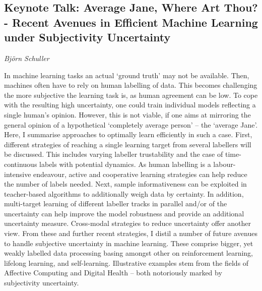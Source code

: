 \documentclass[../booklet.tex]{subfiles}
\begin{document}
\subsection[Keynote Talk: Average Jane, Where Art Thou? - Recent Avenues in Efficient Machine Learning under Subjectivity Uncertainty. {\it Björn Schuller}]{Keynote Talk: Average Jane, Where Art Thou? - Recent Avenues in Efficient Machine Learning under Subjectivity Uncertainty}

\begin{center}
  {\it Björn Schuller}
\end{center}

\vskip 0.8cm


In machine learning tasks an actual `ground truth' may not be available. Then, machines often have to rely on human labelling of data. This becomes challenging the more subjective the learning task is, as human agreement can be low. To cope with the resulting high uncertainty, one could train individual models reflecting a single human's opinion. However, this is not viable, if one aims at mirroring the general opinion of a hypothetical `completely average person' -- the `average Jane'. Here, I summarise approaches to optimally learn efficiently in such a case. First, different strategies of reaching a single learning target from several labellers will be discussed. This includes varying labeller trustability and the case of time-continuous labels with potential dynamics. As human labelling is a labour-intensive endeavour, active and cooperative learning strategies can help reduce the number of labels needed. Next, sample informativeness can be exploited in teacher-based algorithms to additionally weigh data by certainty. In addition, multi-target learning of different labeller tracks in parallel and/or of the uncertainty can help improve the model robustness and provide an additional uncertainty measure. Cross-modal strategies to reduce uncertainty offer another view. From these and further recent strategies, I distil a number of future avenues to handle subjective uncertainty in machine learning. These comprise bigger, yet weakly labelled data processing basing amongst other on reinforcement learning, lifelong learning, and self-learning. Illustrative examples stem from the fields of Affective Computing and Digital Health -- both notoriously marked by subjectivity uncertainty.

% 
\end{document}
